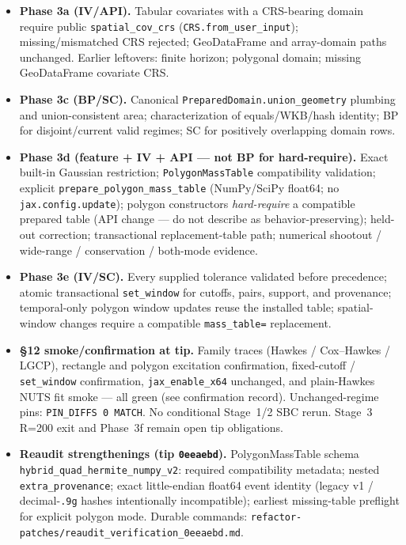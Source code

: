 \documentclass[
  10pt,
]{article}
\providecommand{\tightlist}{%
  \setlength{\itemsep}{0pt}\setlength{\parskip}{0pt}}
\begin{document}
\begin{itemize}
\tightlist
\item
  \textbf{Phase 3a (IV/API).} Tabular covariates with a CRS-bearing domain
  require public \texttt{spatial\_cov\_crs} (\texttt{CRS.from\_user\_input});
  missing/mismatched CRS rejected; GeoDataFrame and array-domain paths
  unchanged. Earlier leftovers: finite horizon; polygonal domain; missing
  GeoDataFrame covariate CRS.
\item
  \textbf{Phase 3c (BP/SC).} Canonical \texttt{PreparedDomain.union\_geometry}
  plumbing and union-consistent area; characterization of equals/WKB/hash
  identity; BP for disjoint/current valid regimes; SC for positively
  overlapping domain rows.
\item
  \textbf{Phase 3d (feature + IV + API --- not BP for hard-require).} Exact
  built-in Gaussian restriction; \texttt{PolygonMassTable} compatibility
  validation; explicit \texttt{prepare\_polygon\_mass\_table} (NumPy/SciPy
  float64; no \texttt{jax.config.update}); polygon constructors
  \emph{hard-require} a compatible prepared table (API change --- do not
  describe as behavior-preserving); held-out correction; transactional
  replacement-table path; numerical shootout / wide-range / conservation /
  both-mode evidence.
\item
  \textbf{Phase 3e (IV/SC).} Every supplied tolerance validated before
  precedence; atomic transactional \texttt{set\_window} for cutoffs,
  pairs, support, and provenance; temporal-only polygon window updates reuse
  the installed table; spatial-window changes require a compatible
  \texttt{mass\_table=} replacement.
\item
  \textbf{§12 smoke/confirmation at tip.} Family traces (Hawkes / Cox--Hawkes /
  LGCP), rectangle and polygon excitation confirmation, fixed-cutoff /
  \texttt{set\_window} confirmation, \texttt{jax\_enable\_x64} unchanged, and
  plain-Hawkes NUTS fit smoke --- all green (see confirmation record).
  Unchanged-regime pins: \texttt{PIN\_DIFFS 0 MATCH}. No conditional Stage~1/2
  SBC rerun. Stage~3 R=200 exit and Phase~3f remain open tip obligations.
\item
  \textbf{Reaudit strengthenings (tip \texttt{0eeaebd}).}
  PolygonMassTable schema \texttt{hybrid\_quad\_hermite\_numpy\_v2}: required
  compatibility metadata; nested \texttt{extra\_provenance}; exact
  little-endian float64 event identity (legacy v1 / decimal-\texttt{.9g}
  hashes intentionally incompatible); earliest missing-table preflight for
  explicit polygon mode. Durable commands:
  \texttt{refactor-patches/reaudit\_verification\_0eeaebd.md}.
\end{itemize}
\end{document}
